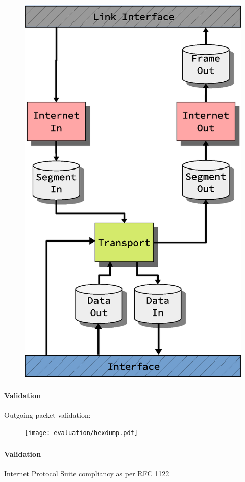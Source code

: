 \begin{frame}[t]
\begin{figure}
        \includegraphics[angle=90,origin=c,scale=0.24]{./background/design_2.eps}
    \end{figure}
\end{frame}

\begin{frame}%
    \frametitle{\EvaluationTitle}
    \framesubtitle{Validation}
    Outgoing packet validation:
    \begin{figure}
        \centering
        \texttt{[image: evaluation/hexdump.pdf]}
    \end{figure}
\end{frame}


\begin{frame}%
    \frametitle{\EvaluationTitle}
    \framesubtitle{Validation}
    Internet Protocol Suite compliancy as per RFC 1122
\end{frame}
